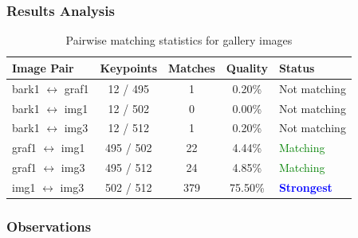 \documentclass[12pt,a4paper]{article}
\begin{document}
\subsubsection{Results Analysis}

\begin{table}[H]
\centering
\begin{tabular}{@{}lcccp{4cm}@{}}
\toprule
\textbf{Image Pair} & \textbf{Keypoints} & \textbf{Matches} & \textbf{Quality} & \textbf{Status} \\
\midrule
bark1 $\leftrightarrow$ graf1 & 12 / 495 & 1 & 0.20\% & Not matching \\
bark1 $\leftrightarrow$ img1 & 12 / 502 & 0 & 0.00\% & Not matching \\
bark1 $\leftrightarrow$ img3 & 12 / 512 & 1 & 0.20\% & Not matching \\
graf1 $\leftrightarrow$ img1 & 495 / 502 & 22 & 4.44\% & \textcolor{green}{Matching} \\
graf1 $\leftrightarrow$ img3 & 495 / 512 & 24 & 4.85\% & \textcolor{green}{Matching} \\
img1 $\leftrightarrow$ img3 & 502 / 512 & 379 & 75.50\% & \textcolor{blue}{\textbf{Strongest}} \\
\bottomrule
\end{tabular}
\caption{Pairwise matching statistics for gallery images}
\end{table}

\subsubsection{Observations}
\end{document}
